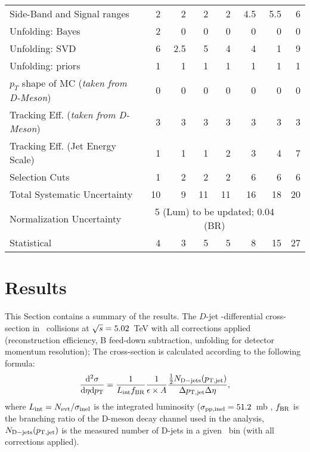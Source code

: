 \begin{table}[bth]
\begin{center}
\begin{tabular}{lrrrrrrr}
Side-Band and Signal ranges & 2 & 2 & 2 & 2 & 4.5 & 5.5 & 6\\
Unfolding: Bayes & 2 & 0 & 0 & 0 & 0 & 0 & 0\\
Unfolding: SVD & 6 & 2.5 & 5 & 4 & 4 & 1 & 9\\
Unfolding: priors & 1 & 1 & 1 & 1 & 1 & 1 & 1\\
$p_T$ shape of MC ({\it taken from D-Meson}) & 0 & 0 & 0 & 0 & 0 & 0 & 0 \\
Tracking Eff. ({\it taken from D-Meson}) & 3 & 3 & 3 & 3 & 3 & 3 & 3 \\
Tracking Eff. (Jet Energy Scale) & 1  & 1 & 1 & 2 & 3 & 4& 7\\
Selection Cuts & 1 & 2 & 2 & 2 & 6 & 6 & 6 \\
\hline
Total Systematic Uncertainty  & 10 & 9 & 11 & 11 & 16 & 18 & 20   \\
\hline
Normalization Uncertainty & \multicolumn{6}{c}{  5 (Lum) to be updated; 0.04 (BR) } \\
\hline %
Statistical & 4 & 3 & 5 & 5 & 8  & 15 & 27\\
\hline
    \end{tabular}
    \end{center}
    \end{table}
    




\section{Results}


This Section contains a summary of the results.
The  $D$-jet \pt-differential cross-section in \pp\ collisions at $\sqrt{s}=5.02$~TeV  with all corrections applied (reconstruction efficiency, B feed-down subtraction, unfolding for detector momentum resolution);
The cross-section is calculated according to the following formula:
\begin{equation}
\frac{{\rm d}^2\sigma}{{\rm d}\eta {\rm d}p_{\rm T}}=\frac{1}{L_{\rm int}f_{\rm BR}} \frac{1}{\epsilon \times A}  \frac{ \frac{1}{2} N_{\rm D-jets}(p_{\mathrm{T,jet}})}{ \Delta p_{\mathrm{T,jet}}\Delta\eta},
\end{equation}
where $L_{\rm int}=N_{\rm evt}/\sigma_{\rm inel}$ is the integrated luminosity ($\sigma_{\rm pp, inel} = 51.2$~mb 
, $f_{\rm BR}$ is the branching
ratio of the D-meson decay channel used in the analysis, $N_{\rm D-jets}(p_{\mathrm{T,jet}})$ is the measured number of D-jets in a given \ptjet\ bin (with all corrections applied).



